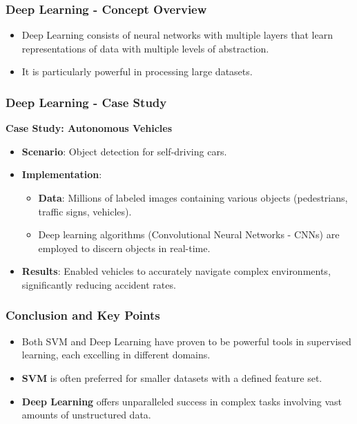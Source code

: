 \documentclass[aspectratio=169]{beamer}
\begin{document}
\begin{frame}[fragile]
    \frametitle{Deep Learning - Concept Overview}
    \begin{itemize}
        \item Deep Learning consists of neural networks with multiple layers that learn representations of data with multiple levels of abstraction.
        \item It is particularly powerful in processing large datasets.
    \end{itemize}
\end{frame}

\begin{frame}[fragile]
    \frametitle{Deep Learning - Case Study}
    \textbf{Case Study: Autonomous Vehicles} 
    \begin{itemize}
        \item \textbf{Scenario}: Object detection for self-driving cars.
        \item \textbf{Implementation}:
        \begin{itemize}
            \item \textbf{Data}: Millions of labeled images containing various objects (pedestrians, traffic signs, vehicles).
            \item Deep learning algorithms (Convolutional Neural Networks - CNNs) are employed to discern objects in real-time.
        \end{itemize}
        \item \textbf{Results}: Enabled vehicles to accurately navigate complex environments, significantly reducing accident rates.
    \end{itemize}
\end{frame}

\begin{frame}[fragile]
    \frametitle{Conclusion and Key Points}
    \begin{itemize}
        \item Both SVM and Deep Learning have proven to be powerful tools in supervised learning, each excelling in different domains. 
        \item \textbf{SVM} is often preferred for smaller datasets with a defined feature set.
        \item \textbf{Deep Learning} offers unparalleled success in complex tasks involving vast amounts of unstructured data.
    \end{itemize}
\end{frame}
\end{document}
